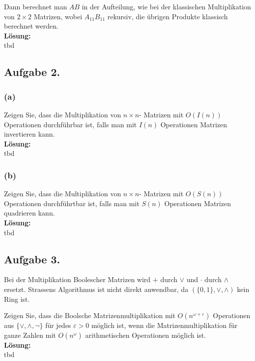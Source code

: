 \documentclass[11pt,a4paper,ngerman]{article}
\begin{document}
Dann berechnet man $AB$ in der Aufteilung, wie bei der klassischen Multiplikation von $2\times 2$ Matrizen, wobei $A_{11}B_{11}$ rekursiv, die übrigen Produkte klassisch berechnet werden.\\

\textbf{Lösung:}\\

tbd

\subsection*{Aufgabe 2.}

\subsubsection*{(a)}

Zeigen Sie, dass die Multiplikation von $n \times n$- Matrizen mit $O(I(n))$ Operationen durchführbar ist, falls man mit $I(n)$ Operationen Matrizen invertieren kann.\\

\textbf{Lösung:}\\

tbd

\subsubsection*{(b)}

Zeigen Sie, dass die Multiplikation von $n \times n$- Matrizen mit $O(S(n))$ Operationen durchführtbar ist, falls man mit $S(n)$ Operationen Matrizen quadrieren kann.\\

\textbf{Lösung:}\\

tbd

\subsection*{Aufgabe 3.}

Bei der Multiplikation Boolescher Matrizen wird $+$ durch $\lor$ und $\cdot$ durch $\land$ ersetzt. Strassens Algorithmus ist nicht direkt anwendbar, da $(\{0,1\}, \lor, \land)$ kein Ring ist.

Zeigen Sie, dass die Boolsche Matrizenmultiplikation mit $O( n^{\omega + \varepsilon} )$ Operationen aus $\{ \lor, \land, \neg \}$ für jedes $\varepsilon > 0$ möglich ist, wenn die Matrizenmultiplikation für ganze Zahlen mit $O(n^\omega )$ arithmetischen Operationen möglich ist.\\

\textbf{Lösung:}\\

tbd

\label{LastPage}
\end{document}

